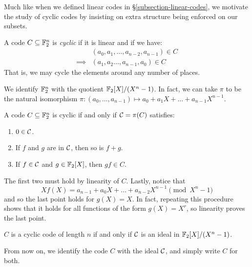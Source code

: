\documentclass{article}
\begin{document}
Much like when we defined linear codes in \S\ref{subsection-linear-codes}, we motivate the study of cyclic codes by insisting on extra structure being enforced on our subsets.

\begin{definition}
	\label{cyclic-code-original}
    A code $C \subseteq \mathbb{F}_2^n$ is \textit{cyclic} if it is linear and if we have:
    \begin{align*}
		&(a_0, a_1, \dots, a_{n-2}, a_{n-1}) \in C \\
		\implies
		&(a_1, a_2 \dots, a_{n-1}, a_0) \in C
	\end{align*}
	That is, we may cycle the elements around any number of places.
\end{definition}

\begin{note}
	We identify $\mathbb{F}_2^n$ with the quotient $\mathbb{F}_2[X] / (X^n - 1)$. In fact, we can take $\pi$ to be the natural isomorphism $\pi : (a_0, \dots, a_{n-1}) \mapsto a_0 + a_1X + \dots + a_{n-1}X^{n-1}$.
\end{note}

\begin{proposition}
    A code $C \subseteq \mathbb{F}_2^n$ is cyclic if and only if $\mathcal{C} = \pi(C)$ satisfies:
    \begin{enumerate}
	    \item $0 \in \mathcal{C}$.
	    \item If $f$ and $g$ are in $\mathcal{C}$, then so is $f + g$.
	    \item If $f \in \mathcal{C}$ and $g \in \mathbb{F}_2[X]$, then $gf \in C$.
	\end{enumerate}
\end{proposition}

\begin{prf}
    The first two must hold by linearity of $C$. Lastly, notice that
    \[
	X f(X) = a_{n-1} + a_{0}X + \dots + a_{n-2}X^{n-1} \pmod{X^n - 1}
	\]
	and so the last point holds for $g(X) = X$. In fact, repeating this procedure shows that it holds for all functions of the form $g(X) = X^r$, so linearity proves the last point.
\end{prf}

\begin{corollary}
    $C$ is a cyclic code of length $n$ if and only if $\mathcal{C}$ is an ideal in $\mathbb{F}_2[X] / (X^n - 1)$.
\end{corollary}

\begin{note}
	From now on, we identify the code $C$ with the ideal $\mathcal{C}$, and simply write $C$ for both.
\end{note}
\end{document}
